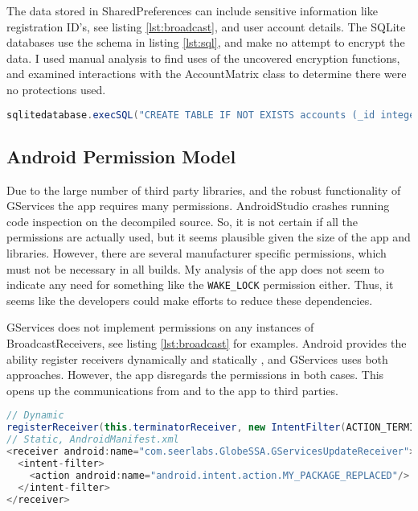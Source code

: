 \documentclass[conference,compsoc]{IEEEtran}
\begin{document}
The data stored in SharedPreferences can include sensitive information like registration ID's, see listing \ref{lst:broadcast}, and user account details. The SQLite databases use the schema in listing \ref{lst:sql}, and make no attempt to encrypt the data. I used manual analysis to find uses of the uncovered encryption functions, and examined interactions with the AccountMatrix class to determine there were no protections used.

\begin{lstlisting}[language=Java, caption=Database scheme for user accounts, label={lst:sql}]
sqlitedatabase.execSQL("CREATE TABLE IF NOT EXISTS accounts (_id integer primary key autoincrement, number text not null, email text not null, name text not null, photoPath text not null, accountDetails text not null, accountBalance text not null, rewardsPoints text not null, planType text not null, alias text not null);");
\end{lstlisting}


\subsection{Android Permission Model}

Due to the large number of third party libraries, and the robust functionality of GServices the app requires many permissions. AndroidStudio crashes running code inspection on the decompiled source. So, it is not certain if all the permissions are actually used, but it seems plausible given the size of the app and libraries. However, there are several manufacturer specific permissions, which must not be necessary in all builds. My analysis of the app does not seem to indicate any need for something like the \texttt{WAKE\_LOCK} permission either. Thus, it seems like the developers could make efforts to reduce these dependencies.

GServices does not implement permissions on any instances of BroadcastReceivers, see listing \ref{lst:broadcast} for examples. Android provides the ability register receivers dynamically and statically \cite{Google:broadcast}, and GServices uses both approaches. However, the app disregards the permissions in both cases. This opens up the communications from and to the app to third parties\cite{Google:broadcast}.

\begin{lstlisting}[language=Java, caption=BroadcastReceiver permissions implemented insecurely, label={lst:broadcast}]
// Dynamic
registerReceiver(this.terminatorReceiver, new IntentFilter(ACTION_TERMINATE));
// Static, AndroidManifest.xml
<receiver android:name="com.seerlabs.GlobeSSA.GServicesUpdateReceiver">
  <intent-filter>
    <action android:name="android.intent.action.MY_PACKAGE_REPLACED"/>
  </intent-filter>
</receiver>
\end{lstlisting}
\end{document}
